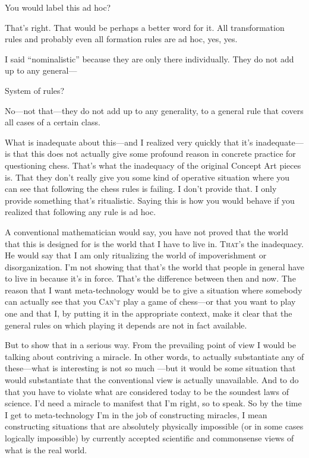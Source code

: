  You would label this ad hoc? 

 That's right. That would be perhaps a better word for it. All 
transformation rules and probably even all formation rules are ad hoc, 
yes, yes. 

I said \enquote{nominalistic} because they are only there individually. 
They do not add up to any general--- 

 System of rules? 

 No---not that---they do not add up to any generality, to a 
general rule that covers all cases of a certain class. 

What is inadequate about this---and I realized very quickly that 
it's inadequate---is that this does not actually give some profound 
reason in concrete practice for questioning chess. That's what the 
inadequacy of the original Concept Art pieces is. That they don't really 
give you some kind of operative situation where you can see that 
following the chess rules is failing. I don't provide that. I only provide 
something that's ritualistic. Saying this is how you would behave if you 
realized that following any rule is ad hoc. 

A conventional mathematician would say, you have not proved 
that the world that this is designed for is the world that I have to live in. 
\textsc{That}'s the inadequacy. He would say that I am only ritualizing the 
world of impoverishment or disorganization. I'm not showing that 
that's the world that people in general have to live in because it's in 
force. That's the difference between then and now. The reason that I 
want meta-technology would be to give a situation where somebody 
can actually see that you \textsc{Can't} play a game of chess---or that you want 
to play one and that I, by putting it in the appropriate context, make it 
clear that the general rules on which playing it depends are not in fact 
available. 

But to show that in a serious way. From the prevailing point of 
view I would be talking about contriving a miracle. In other words, to 
actually substantiate any of these---what is interesting is not so much 
---but it would be some situation that would substantiate 
that the conventional view is actually unavailable. And to do 
that you have to violate what are considered today to be the soundest 
laws of science. I'd need a miracle to manifest that I'm right, so to 
speak. So by the time I get to meta-technology I'm in the job of 
constructing miracles, I mean constructing situations that are
absolutely physically impossible (or in some cases logically impossible) by 
currently accepted scientific and commonsense views of what is the real 
world. 

